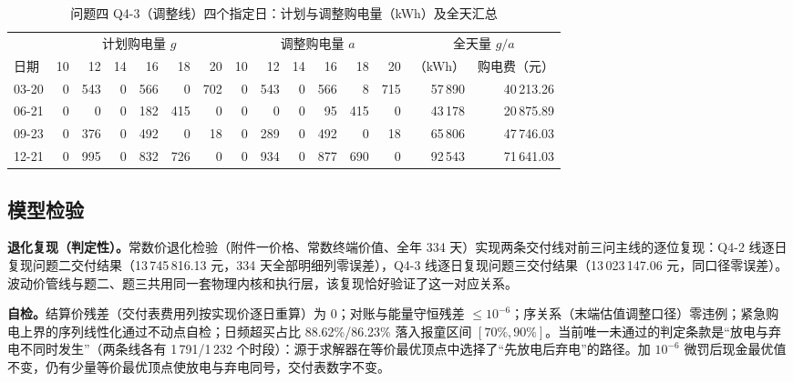 \documentclass[12pt,a4paper]{ctexart}
\begin{document}
\begin{table}[H]
\centering\footnotesize\setlength{\tabcolsep}{3pt}
\caption{问题四 Q4-3（调整线）四个指定日：计划与调整购电量（kWh）及全天汇总}
\begin{adjustbox}{max width=\textwidth}
\begin{tabular}{lrrrrrrrrrrrrrr}
\toprule
 & \multicolumn{6}{c}{计划购电量 $g$} & \multicolumn{6}{c}{调整购电量 $a$} & \multicolumn{2}{c}{全天量 $g/a$} \\
\cmidrule(lr){2-7}\cmidrule(lr){8-13}\cmidrule(lr){14-15}
日期 & 10 & 12 & 14 & 16 & 18 & 20 & 10 & 12 & 14 & 16 & 18 & 20 & （kWh） & 购电费（元） \\
\midrule
03-20 & 0 & 543 & 0 & 566 & 0 & 702 & 0 & 543 & 0 & 566 & 8 & 715 & 57\,890 & 40\,213.26 \\
06-21 & 0 & 0 & 0 & 182 & 415 & 0 & 0 & 0 & 0 & 95 & 415 & 0 & 43\,178 & 20\,875.89 \\
09-23 & 0 & 376 & 0 & 492 & 0 & 18 & 0 & 289 & 0 & 492 & 0 & 18 & 65\,806 & 47\,746.03 \\
12-21 & 0 & 995 & 0 & 832 & 726 & 0 & 0 & 934 & 0 & 877 & 690 & 0 & 92\,543 & 71\,641.03 \\
\bottomrule
\end{tabular}
\end{adjustbox}
\label{tab:q4d3}
\end{table}

\subsection{模型检验}

\textbf{退化复现（判定性）。}常数价退化检验（附件一价格、常数终端价值、全年 334 天）实现两条交付线对前三问主线的逐位复现：Q4-2 线逐日复现问题二交付结果（13\,745\,816.13 元，334 天全部明细列零误差），Q4-3 线逐日复现问题三交付结果（13\,023\,147.06 元，同口径零误差）。波动价管线与题二、题三共用同一套物理内核和执行层，该复现恰好验证了这一对应关系。

\textbf{自检。}结算价残差（交付表费用列按实现价逐日重算）为 0；对账与能量守恒残差 $\le10^{-6}$；序关系（末端估值调整口径）零违例；紧急购电上界的序列线性化通过不动点自检；日频超买占比 88.62\%/86.23\% 落入报童区间 $[70\%,90\%]$。当前唯一未通过的判定条款是“放电与弃电不同时发生”（两条线各有 1\,791/1\,232 个时段）：源于求解器在等价最优顶点中选择了“先放电后弃电”的路径。加 $10^{-6}$ 微罚后现金最优值不变，仍有少量等价最优顶点使放电与弃电同号，交付表数字不变。

\end{document}
